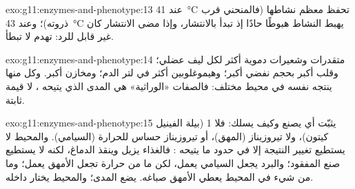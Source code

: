 \begin{solution}{exo:g11:enzymes-and-phenotype:13}
عند \qty{41}{\celsius} تحفظ  معظم نشاطها (فالمنحني قرب ذروته)؛
وعند \qty{43}{\celsius} يهبط النشاط هبوطًا حادًا إذ تبدأ 
بالانتشار، وإذا مضى الانتشار كان غير قابل للرد:  تهدم لا
تبطأ.
\end{solution}

\begin{solution}{exo:g11:enzymes-and-phenotype:14}
متقدرات وشعيرات دموية أكثر لكل ليف عضلي؛ وقلب أكبر بحجم نفضي أكبر؛
وهيموغلوبين أكثر في لتر الدم؛ ومخازن  أكبر. وكل منها  ينتجه  نفسه في محيط مختلف: فالصفات «الوراثية» هي
المدى الذي يتيحه ، لا قيمة ثابتة.
\end{solution}

\begin{solution}{exo:g11:enzymes-and-phenotype:15}
 يثبّت أي  يصنع وكيف يسلك: فلا  1 (بيلة الفينيل
كيتون)، ولا تيروزيناز (المهق)، أو تيروزيناز حساس للحرارة (السيامي).
والمحيط لا يستطيع تغيير النتيجة إلا في حدود ما يتيحه : فالغذاء
يزيل  وينقذ الدماغ، لكنه لا يستطيع صنع  المفقود؛ والبرد
يجعل  السيامي يعمل، لكن ما من حرارة تجعل  الأمهق يعمل؛
وما من شيء في المحيط يعطي الأمهق صباغه.  يضع المدى؛
والمحيط يختار داخله.
\end{solution}

